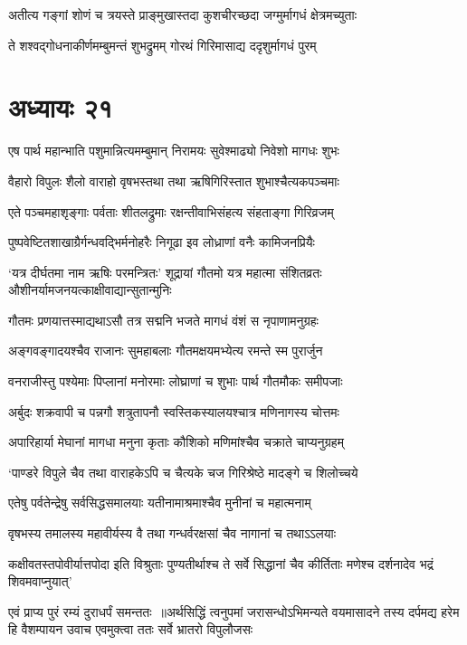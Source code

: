 \twolineshloka
{अतीत्य गङ्गां शोणं च त्रयस्ते प्राङ्मुखास्तदा}
{कुशचीरच्छदा जग्मुर्मागधं क्षेत्रमच्युताः}


\twolineshloka
{ते शश्वद्गोधनाकीर्णमम्बुमन्तं शुभद्रुमम्}
{गोरथं गिरिमासाद्य ददृशुर्मागधं पुरम्}


\chapter{अध्यायः २१}
\twolineshloka
{एष पार्थ महान्भाति पशुमान्नित्यमम्बुमान्}
{निरामयः सुवेश्माढ्यो निवेशो मागधः शुभः}


\twolineshloka
{वैहारो विपुलः शैलो वाराहो वृषभस्तथा}
{तथा ऋषिगिरिस्तात शुभाश्चैत्यकपञ्चमाः}


\twolineshloka
{एते पञ्चमहाशृङ्गाः पर्वताः शीतलद्रुमाः}
{रक्षन्तीवाभिसंहत्य संहताङ्गा गिरिव्रजम्}


\twolineshloka
{पुष्पवेष्टितशाखाग्रैर्गन्धवद्भिर्मनोहरैः}
{निगूढा इव लोध्राणां वनैः कामिजनप्रियैः}


\threelineshloka
{`यत्र दीर्घतमा नाम ऋषिः परमन्त्रितः'}
{शूद्रायां गौतमो यत्र महात्मा संशितव्रतः}
{औशीनर्यामजनयत्काक्षीवाद्यान्सुतान्मुनिः}


\threelineshloka
{गौतमः प्रणयात्तस्माद्यथाऽसौ तत्र सद्मनि}
{भजते मागधं वंशं स नृपाणामनुग्रहः}
{}


\twolineshloka
{अङ्गवङ्गादयश्चैव राजानः सुमहाबलाः}
{गौतमक्षयमभ्येत्य रमन्ते स्म पुरार्जुन}


\twolineshloka
{वनराजीस्तु पश्येमाः पिप्लानां मनोरमाः}
{लोघ्राणां च शुभाः पार्थ गौतमौकः समीपजाः}


\twolineshloka
{अर्बुदः शक्रवापी च पन्नगौ शत्रुतापनौ}
{स्वस्तिकस्यालयश्चात्र मणिनागस्य चोत्तमः}


\twolineshloka
{अपारिहार्या मेघानां मागधा मनुना कृताः}
{कौशिको मणिमांश्चैव चक्राते चाप्यनुग्रहम्}


\twolineshloka
{`पाण्डरे विपुले चैव तथा वाराहकेऽपि च}
{चैत्यके चज गिरिश्रेष्ठे मादङ्गे च शिलोच्चये}


\twolineshloka
{एतेषु पर्वतेन्द्रेषु सर्वसिद्धसमालयाः}
{यतीनामाश्रमाश्चैव मुनीनां च महात्मनाम्}


\twolineshloka
{वृषभस्य तमालस्य महावीर्यस्य वै तथा}
{गन्धर्वरक्षसां चैव नागानां च तथाऽऽलयाः}


\threelineshloka
{कक्षीवतस्तपोवीर्यात्तपोदा इति विश्रुताः}
{पुण्यतीर्थाश्च ते सर्वे सिद्धानां चैव कीर्तिताः}
{मणेश्च दर्शनादेव भद्रं शिवमवाप्नुयात्'}


एवं प्राप्य पुरं रम्यं दुराधर्पं समन्ततः ॥अर्थसिद्धिं त्वनुपमां जरासन्धोऽभिमन्यते
\threelineshloka
{वयमासादने तस्य दर्पमद्य हरेम हि}
{वैशम्पायन उवाच}
{एवमुक्त्वा ततः सर्वे भ्रातरो विपुलौजसः}


